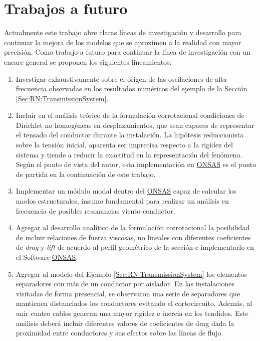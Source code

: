 \section{Trabajos a futuro}

Actualmente este trabajo abre claras líneas de investigación y desarrollo para continuar la mejora de los modelos que se aproximen a la realidad con mayor precisión. Como trabajo a futuro para continuar la línea de investigación con un encare general se proponen los siguientes lineamientos:

\begin{enumerate}
	\item Investigar exhaustivamente sobre el origen de las oscilaciones de alta frecuencia observadas en los resultados numéricos del ejemplo de la Sección \ref{Sec:RN:TransmissionSystem}.
	\item Incluir en el análisis teórico de la formulación corrotacional condiciones de Dirichlet no homogéneas en desplazamientos, que sean capaces de representar el tensado del conductor durante la instalación. La hipótesis reduccionista sobre la tensión inicial, aparenta ser imprecisa respecto a la rigidez del sistema y tiende a reducir la exactitud en la representación del fenómeno. Según el punto de vista del autor, esta implementación en \href{https://github.com/ONSAS/ONSAS/}{ONSAS} es el punto de partida en la continuación de este trabajo. 
	\item Implementar un módulo modal dentro del \href{https://github.com/ONSAS/ONSAS/}{ONSAS} capaz de calcular los modos estructurales, insumo fundamental para realizar un análisis en frecuencia de posibles resonancias viento-conductor.
	\item Agregar al desarrollo analítico de la formulación corrotacional la posibilidad de incluir relaciones de fuerza viscosas, no lineales con diferentes coeficientes de \textit{drag} y \textit{lift} de acuerdo al perfil geométrico de la sección e implementarlo en el Software \href{https://github.com/ONSAS/ONSAS/}{ONSAS}.
	\item Agregar al modelo del Ejemplo \ref{Sec:RN:TransmissionSystem} los elementos separadores con más de un conductor por aislador. En las instalaciones visitadas de forma presencial, se observaron una serie de separadores que mantienen distanciados los conductores evitando el cortocircuito. Además, al unir cuatro cables generan una mayor rigidez e inercia en los tendidos. Este análisis deberá incluir diferentes valores de coeficientes de drag dada la proximidad entre conductores y sus efectos sobre las líneas de flujo.  

\end{enumerate}
